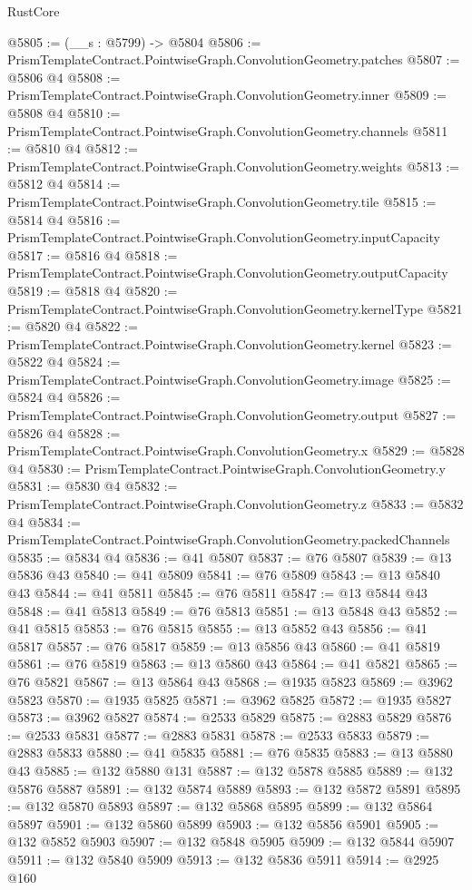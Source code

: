 \begin{lexlean}{RustCore}
\begin{coremodule}
@5805 := (__s : @5799) -> @5804
@5806 := PrismTemplateContract.PointwiseGraph.ConvolutionGeometry.patches
@5807 := @5806 @4
@5808 := PrismTemplateContract.PointwiseGraph.ConvolutionGeometry.inner
@5809 := @5808 @4
@5810 := PrismTemplateContract.PointwiseGraph.ConvolutionGeometry.channels
@5811 := @5810 @4
@5812 := PrismTemplateContract.PointwiseGraph.ConvolutionGeometry.weights
@5813 := @5812 @4
@5814 := PrismTemplateContract.PointwiseGraph.ConvolutionGeometry.tile
@5815 := @5814 @4
@5816 := PrismTemplateContract.PointwiseGraph.ConvolutionGeometry.inputCapacity
@5817 := @5816 @4
@5818 := PrismTemplateContract.PointwiseGraph.ConvolutionGeometry.outputCapacity
@5819 := @5818 @4
@5820 := PrismTemplateContract.PointwiseGraph.ConvolutionGeometry.kernelType
@5821 := @5820 @4
@5822 := PrismTemplateContract.PointwiseGraph.ConvolutionGeometry.kernel
@5823 := @5822 @4
@5824 := PrismTemplateContract.PointwiseGraph.ConvolutionGeometry.image
@5825 := @5824 @4
@5826 := PrismTemplateContract.PointwiseGraph.ConvolutionGeometry.output
@5827 := @5826 @4
@5828 := PrismTemplateContract.PointwiseGraph.ConvolutionGeometry.x
@5829 := @5828 @4
@5830 := PrismTemplateContract.PointwiseGraph.ConvolutionGeometry.y
@5831 := @5830 @4
@5832 := PrismTemplateContract.PointwiseGraph.ConvolutionGeometry.z
@5833 := @5832 @4
@5834 := PrismTemplateContract.PointwiseGraph.ConvolutionGeometry.packedChannels
@5835 := @5834 @4
@5836 := @41 @5807
@5837 := @76 @5807
@5839 := @13 @5836 @43
@5840 := @41 @5809
@5841 := @76 @5809
@5843 := @13 @5840 @43
@5844 := @41 @5811
@5845 := @76 @5811
@5847 := @13 @5844 @43
@5848 := @41 @5813
@5849 := @76 @5813
@5851 := @13 @5848 @43
@5852 := @41 @5815
@5853 := @76 @5815
@5855 := @13 @5852 @43
@5856 := @41 @5817
@5857 := @76 @5817
@5859 := @13 @5856 @43
@5860 := @41 @5819
@5861 := @76 @5819
@5863 := @13 @5860 @43
@5864 := @41 @5821
@5865 := @76 @5821
@5867 := @13 @5864 @43
@5868 := @1935 @5823
@5869 := @3962 @5823
@5870 := @1935 @5825
@5871 := @3962 @5825
@5872 := @1935 @5827
@5873 := @3962 @5827
@5874 := @2533 @5829
@5875 := @2883 @5829
@5876 := @2533 @5831
@5877 := @2883 @5831
@5878 := @2533 @5833
@5879 := @2883 @5833
@5880 := @41 @5835
@5881 := @76 @5835
@5883 := @13 @5880 @43
@5885 := @132 @5880 @131
@5887 := @132 @5878 @5885
@5889 := @132 @5876 @5887
@5891 := @132 @5874 @5889
@5893 := @132 @5872 @5891
@5895 := @132 @5870 @5893
@5897 := @132 @5868 @5895
@5899 := @132 @5864 @5897
@5901 := @132 @5860 @5899
@5903 := @132 @5856 @5901
@5905 := @132 @5852 @5903
@5907 := @132 @5848 @5905
@5909 := @132 @5844 @5907
@5911 := @132 @5840 @5909
@5913 := @132 @5836 @5911
@5914 := @2925 @160

\end{coremodule}
\end{lexlean}
